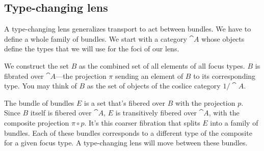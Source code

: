 \documentclass[DaoFP]{subfiles}
\begin{document}
\subsection{Type-changing lens}

A type-changing lens generalizes transport to act between bundles. We have to define a whole family of bundles. We start with a category $\cat A$ whose objects define the types that we will use for the foci of our lens. 

We construct the set $B$ as the combined set of all elements of all focus types. $B$ is fibrated over $\cat A$---the projection $\pi$ sending an element of $B$ to its corresponding type. You may think of $B$ as the set of objects of the coslice category $1/ \cat A$.

The bundle of bundles $E$ is a set that's fibered over $B$ with the projection $p$. Since $B$ itself is fibered over $\cat A$, $E$ is transitively fibered over $\cat A$, with the composite projection $\pi \circ p$. It's this coarser fibration that splits $E$ into a family of bundles. Each of these bundles corresponds to a different type of the composite for a given focus type. A type-changing lens will move between these bundles. 
\end{document}
